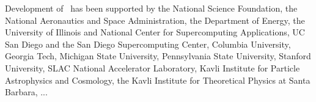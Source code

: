 
\acknowledgments

Development of \enzo\ has been supported by the National Science
Foundation, the National Aeronautics and Space Administration, the
Department of Energy, the University of Illinois and National Center
for Supercomputing Applications, UC San Diego and the San Diego
Supercomputing Center, Columbia University, Georgia Tech, Michigan
State University, Pennsylvania State University, Stanford University,
SLAC National Accelerator Laboratory, Kavli Institute for Particle
Astrophysics and Cosmology, the Kavli Institute for Theoretical
Physics at Santa Barbara, ...  
